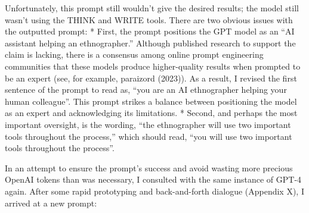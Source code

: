 \documentclass[
]{book}
\begin{document}
Unfortunately, this prompt still wouldn't give the desired results; the model still wasn't using the THINK and WRITE tools. There are two obvious issues with the outputted prompt: * First, the prompt positions the GPT model as an ``AI assistant helping an ethnographer.'' Although published research to support the claim is lacking, there is a consensus among online prompt engineering communities that these models produce higher-quality results when prompted to be an expert (see, for example, paraizord (2023)). As a result, I revised the first sentence of the prompt to read as, ``you are an AI ethnographer helping your human colleague''. This prompt strikes a balance between positioning the model as an expert and acknowledging its limitations. * Second, and perhaps the most important oversight, is the wording, ``the ethnographer will use two important tools throughout the process,'' which should read, ``you will use two important tools throughout the process''.

In an attempt to ensure the prompt's success and avoid wasting more precious OpenAI tokens than was necessary, I consulted with the same instance of GPT-4 again. After some rapid prototyping and back-and-forth dialogue (Appendix X), I arrived at a new prompt:
\end{document}
